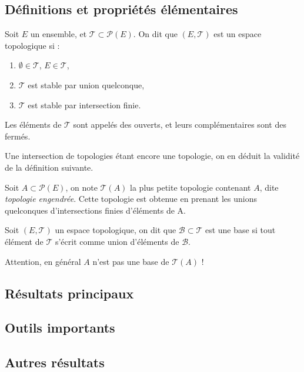 \documentclass[12pt,a4paper]{article}
\begin{document}
\subsection*{Définitions et propriétés élémentaires}
\begin{definstar}
Soit $E$ un ensemble, et $\mathcal{T} \subset \mathcal{P}(E)$.  On dit que $(E,\mathcal{T})$ est un espace topologique si :
\begin{enumerate}
\item $\emptyset \in \mathcal{T}$, $E \in \mathcal{T}$,
\item $\mathcal{T}$ est stable par union quelconque,
\item $\mathcal{T}$ est stable par intersection finie.
\end{enumerate}
Les éléments de $\mathcal{T}$ sont appelés des ouverts, et leurs complémentaires sont des fermés.
\end{definstar}
\begin{rmq}
Une intersection de topologies étant encore une topologie, on en déduit la validité de la définition suivante.
\end{rmq}
\begin{definstar}
Soit $A \subset \mathcal{P}(E)$, on note $\mathcal{T}(A)$ la plus petite topologie contenant $A$, dite \textit{topologie engendrée}. Cette topologie est obtenue en prenant les unions quelconques d'intersections finies
d'éléments de A.
\end{definstar}

\begin{definstar}
Soit $(E,\mathcal{T})$ un espace topologique, on dit que $\mathcal{B}\subset \mathcal{T}$ est une base si tout élément de $\mathcal{T}$ s'écrit comme union d'éléments de $\mathcal{B}$.
\end{definstar}
\begin{rmq}
Attention, en général $A$ n'est pas une base de $\mathcal{T}(A)$ !
\end{rmq}

\subsection*{Résultats principaux}

\subsection*{Outils importants}

\subsection*{Autres résultats}
\end{document}
